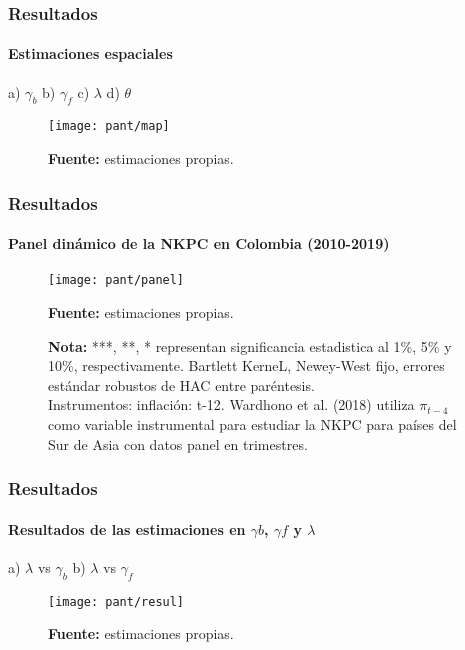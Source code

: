 \documentclass[10pt]{beamer}
\begin{document}
\begin{frame}
\frametitle{Resultados}
\framesubtitle{Estimaciones espaciales}
a) $\gamma_{b}$ \hspace*{2cm} b) $\gamma_{f}$ \hspace*{2cm} c) $\lambda$\hspace*{2cm} d) $\theta$
\begin{figure}
\texttt{[image: pant/map]}
\centering
\label{fig:ejemplo}\\
  \raggedright  \tiny \textbf{Fuente:} estimaciones propias.
\end{figure}
\end{frame} 

\begin{frame}
\frametitle{Resultados}
\framesubtitle{Panel dinámico de la NKPC en Colombia (2010-2019)}
\begin{figure}
\texttt{[image: pant/panel]}
\centering
\label{fig:ejemplo}\\
  \raggedright  \tiny \textbf{Fuente:} estimaciones propias. \\
\raggedright  \tiny \textbf{Nota:} ***,  **, * representan significancia estadistica al 1\%, 5\% y 10\%, respectivamente. Bartlett KerneL, Newey-West fijo, errores estándar robustos de HAC entre paréntesis.\\
Instrumentos: inflación: t-12. Wardhono et al. (2018) utiliza  $\pi_{t-4}$ como variable instrumental para estudiar la NKPC para países del Sur de Asia con datos panel en trimestres.\\
\end{figure}
\end{frame} 

\begin{frame}
\frametitle{Resultados}
\framesubtitle{Resultados de las estimaciones en $\gamma{b}$, $\gamma{f}$ y $\lambda$}
a) $\lambda$ vs $\gamma_{b}$ \hspace*{4.5cm} b) $\lambda$ vs $\gamma_{f}$
\begin{figure}
\texttt{[image: pant/resul]}
\centering
\label{fig:ejemplo}\\
  \raggedright  \tiny \textbf{Fuente:} estimaciones propias.
\end{figure}
\end{frame} 
\end{document}
